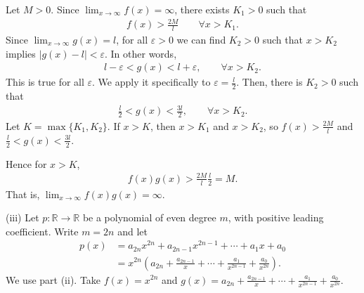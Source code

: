 \documentclass[letterpaper,10pt,english]{jupyterBook}
\begin{document}
Let \(M > 0\). Since \(\lim_{x\rightarrow\infty}f(x)=\infty\), there exists \(K_1 > 0\) such that
\begin{equation*}
\begin{split}
f(x)>\frac{2M}{l} \hspace{2em} \forall x > K_1.
\end{split}
\end{equation*}
\sphinxAtStartPar
Since \(\lim_{x\rightarrow\infty}g(x)=l\), for all \(\varepsilon>0\) we can find \(K_2>0\) such that \(x>K_2\) implies \(|g(x)-l|<\varepsilon\). In other words,
\begin{equation*}
\begin{split}
l-\varepsilon < g(x) < l+\varepsilon, \hspace{2em} \forall x>K_2.
\end{split}
\end{equation*}
\sphinxAtStartPar
This is true for all \(\varepsilon\). We apply it specifically to \(\varepsilon = \frac{l}{2}\). Then, there is \(K_2>0\) such that
\begin{equation*}
\begin{split}
\frac{l}{2} < g(x) < \frac{3l}{2}, \hspace{2em} \forall x>K_2.
\end{split}
\end{equation*}
\sphinxAtStartPar
Let \(K=\max\{K_1,K_2\}\). If \(x>K\), then \(x>K_1\) and \(x>K_2\), so \(f(x)>\frac{2M}{l}\) and \(\frac{l}{2} < g(x) < \frac{3l}{2}\).

Hence for \(x>K\),
\begin{equation*}
\begin{split}
f(x)g(x) > \frac{2M}{l}\frac{l}{2} = M.
\end{split}
\end{equation*}
\sphinxAtStartPar
That is, \(\lim_{x\rightarrow\infty}f(x)g(x) = \infty\).

\sphinxAtStartPar
(iii) Let \(p:\mathbb{R}\to\mathbb{R}\) be a polynomial of even degree \(m\), with positive leading coefficient. Write \(m = 2n\) and let
\begin{align*}
p(x) &= a_{2n}x^{2n} + a_{2n-1}x^{2n-1} + \cdots + a_{1}x + a_{0}\\
&= x^{2n}\left(a_{2n} + \frac{a_{2n-1}}{x} + \cdots + \frac{a_{1}}{x^{2n-1}} + \frac{a_{0}}{x^{2n}}\right). 
\end{align*}
\sphinxAtStartPar
We use part (ii). Take \(f(x) = x^{2n}\) and \(\displaystyle g(x) = a_{2n} + \frac{a_{2n-1}}{x} + \cdots + \frac{a_{1}}{x^{2n-1}} + \frac{a_{0}}{x^{2n}}\).
\end{document}
